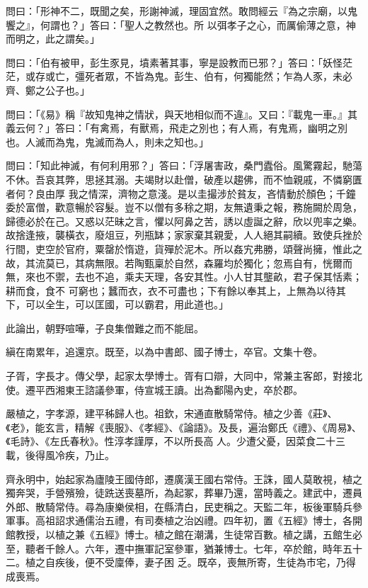 \begin{pinyinscope}
 問曰：「形神不二，既聞之矣，形謝神滅，理固宜然。敢問經云『為之宗廟，以鬼饗之』，何謂也？」答曰：「聖人之教然也。所
 以弭孝子之心，而厲偷薄之意，神而明之，此之謂矣。」



 問曰：「伯有被甲，彭生豕見，墳素著其事，寧是設教而已邪？」答曰：「妖怪茫茫，或存或亡，彊死者眾，不皆為鬼。彭生、伯有，何獨能然；乍為人豕，未必齊、鄭之公子也。」



 問曰：「《易》稱『故知鬼神之情狀，與天地相似而不違』。又曰：『載鬼一車。』其義云何？」答曰：「有禽焉，有獸焉，飛走之別也；有人焉，有鬼焉，幽明之別也。人滅而為鬼，鬼滅而為人，則未之知也。」



 問曰：「知此神滅，有何利用邪？」答曰：「浮屠害政，桑門蠹俗。風驚霧起，馳蕩不休。吾哀其弊，思拯其溺。夫竭財以赴僧，破產以趨佛，而不恤親戚，不憐窮匱者何？良由厚
 我之情深，濟物之意淺。是以圭撮涉於貧友，吝情動於顏色；千鐘委於富僧，歡意暢於容髮。豈不以僧有多稌之期，友無遺秉之報，務施闕於周急，歸德必於在己。又惑以茫昧之言，懼以阿鼻之苦，誘以虛誕之辭，欣以兜率之樂。故捨逢掖，襲橫衣，廢俎豆，列瓶缽；家家棄其親愛，人人絕其嗣續。致使兵挫於行間，吏空於官府，粟罄於惰遊，貨殫於泥木。所以姦宄弗勝，頌聲尚擁，惟此之故，其流莫已，其病無限。若陶甄稟於自然，森羅均於獨化；忽焉自有，恍爾而無，來也不禦，去也不追，乘夫天理，各安其性。小人甘其壟畝，君子保其恬素；耕而食，食不
 可窮也；蠶而衣，衣不可盡也；下有餘以奉其上，上無為以待其下，可以全生，可以匡國，可以霸君，用此道也。」



 此論出，朝野喧嘩，子良集僧難之而不能屈。



 縝在南累年，追還京。既至，以為中書郎、國子博士，卒官。文集十卷。



 子胥，字長才。傳父學，起家太學博士。胥有口辯，大同中，常兼主客郎，對接北使。遷平西湘東王諮議參軍，侍宣城王讀。出為鄱陽內史，卒於郡。



 嚴植之，字孝源，建平秭歸人也。祖欽，宋通直散騎常侍。植之少善《莊》、《老》，能玄言，精解《喪服》、《孝經》、《論語》。及長，遍治鄭氏《禮》、《周易》、《毛詩》、《左氏春秋》。性淳孝謹厚，不以所長高
 人。少遭父憂，因菜食二十三載，後得風冷疾，乃止。



 齊永明中，始起家為廬陵王國侍郎，遷廣漢王國右常侍。王誅，國人莫敢視，植之獨奔哭，手營殯殮，徒跣送喪墓所，為起冢，葬畢乃還，當時義之。建武中，遷員外郎、散騎常侍。尋為康樂侯相，在縣清白，民吏稱之。天監二年，板後軍騎兵參軍事。高祖詔求通儒治五禮，有司奏植之治凶禮。四年初，置《五經》博士，各開館教授，以植之兼《五經》博士。植之館在潮溝，生徒常百數。植之講，五館生必至，聽者千餘人。六年，遷中撫軍記室參軍，猶兼博士。七年，卒於館，時年五十二。植之自疾後，便不受廩俸，妻子困
 乏。既卒，喪無所寄，生徒為市宅，乃得成喪焉。




\end{pinyinscope}
